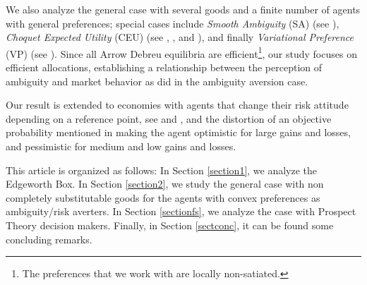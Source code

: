 \documentclass[pdftex]{article}
\numberwithin{equation}{section}
\theoremstyle{th}
\newtheorem{proof lemma}{{Proof Lemma}.}
\theoremstyle{definition}
\begin{document}
We also analyze the general case with several goods
and a finite number of agents with general preferences; special cases include \emph{Smooth Ambiguity} (SA) (see \cite{KMM}), \emph{Choquet Expected Utility} (CEU) (see \cite{Schmeidler}, \cite{GS}, \cite{Yaari} and \cite{Quiggin1,Quiggin2}), and finally \emph{Variational Preference} (VP) (see \cite{MMR}). {Since} all Arrow Debreu equilibria are efficient\footnote{The preferences that we work with are locally non-satiated.}, our study focuses on efficient allocations, establishing a relationship between the perception of ambiguity and market behavior as \cite{RSS} {did in the ambiguity aversion case}. 


Our result is extended to economies with agents that change their risk attitude depending on a reference point, see \cite{KT} and \cite{JS}, and the distortion of an objective probability mentioned in \cite{KT92} making the agent optimistic for large gains and losses, and pessimistic for medium and low gains and losses.







This article is organized as follows: In Section \ref{section1}, we analyze the Edgeworth Box. In Section \ref{section2}, we study the general case with non completely substitutable goods for the agents with convex preferences as ambiguity/risk averters.
 In Section \ref{sectionfs}, we analyze the case with Prospect Theory decision makers. Finally, in Section \ref{sectconc}, it can be found some concluding remarks.
\end{document}

